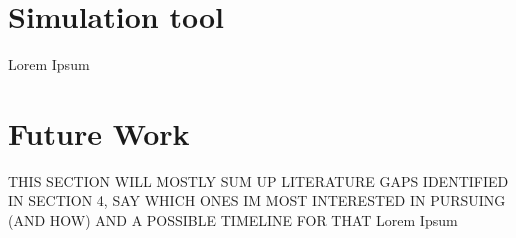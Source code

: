\documentclass[a4paper,12pt]{article}
\begin{document}
\section{Simulation tool} \label{s:sim}
Lorem Ipsum

\pagebreak

\section{Future Work} \label{s:concl}
THIS SECTION WILL MOSTLY SUM UP LITERATURE GAPS IDENTIFIED IN SECTION 4, SAY WHICH ONES IM MOST INTERESTED IN PURSUING (AND HOW) AND A POSSIBLE TIMELINE FOR THAT
Lorem Ipsum

\pagebreak



\end{document}
